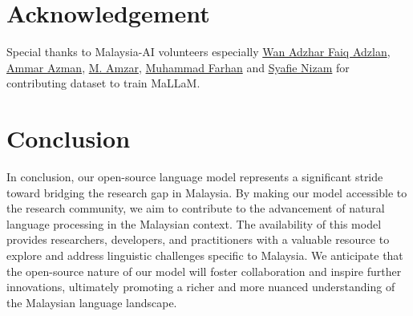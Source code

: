 \documentclass[preprint]{article}
\begin{document}
\section{Acknowledgement}

Special thanks to Malaysia-AI volunteers especially \href{https://www.linkedin.com/in/wan-adzhar-faiq-adzlan-19a27baa/}{Wan Adzhar Faiq Adzlan}, \href{https://www.linkedin.com/in/ammar-azman/}{Ammar Azman}, \href{https://www.linkedin.com/in/amzar96/}{M. Amzar}, \href{https://www.linkedin.com/in/muhammad-farhan-helmy-0529501a7/}{Muhammad Farhan} and \href{https://www.linkedin.com/in/syafie-nizam/}{Syafie Nizam} for contributing dataset to train MaLLaM.

\section{Conclusion}

In conclusion, our open-source language model represents a significant stride toward bridging the research gap in Malaysia. By making our model accessible to the research community, we aim to contribute to the advancement of natural language processing in the Malaysian context. The availability of this model provides researchers, developers, and practitioners with a valuable resource to explore and address linguistic challenges specific to Malaysia. We anticipate that the open-source nature of our model will foster collaboration and inspire further innovations, ultimately promoting a richer and more nuanced understanding of the Malaysian language landscape.

{}

\end{document}
